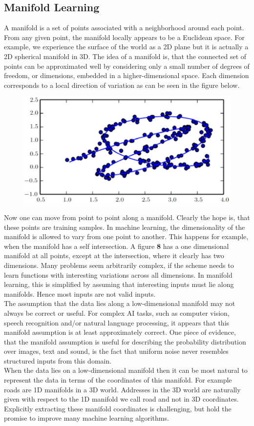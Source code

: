 \begin{multicols}{2}
	\subsection{Manifold Learning}
	A manifold is a set of points associated with a neighborhood around each point.
	From any given point, the manifold locally appears to be a Euclidean space.
	For example, we experience the surface of the world as a 2D plane but it is actually a 2D spherical manifold in 3D.
	The idea of a manifold is, that the connected set of points can be approximated well by considering only a small number of degrees of freedom, or dimensions, embedded in a higher-dimensional space. Each dimension corresponds to a local direction of variation as can be seen in the figure below.
	\begin{figure}[H]
		\centering
		\includegraphics[width=0.75\linewidth]{images/mani.PNG}
	\end{figure}
	Now one can move from point to point along a manifold. Clearly the hope is, that these points are training samples.
	In machine learning, the dimensionality of the manifold is allowed to vary from one point to another.
	This happens for example, when the manifold has a self intersection.
	A figure \textbf{8} has a one dimensional manifold at all points, except at the intersection, where it clearly has two dimensions.
	Many problems seem arbitrarily complex, if the scheme needs to learn functions with interesting variations across all dimensions.
	In manifold learning, this is simplified by assuming that interesting inputs must lie along manifolds. Hence most inputs are not valid inputs.\\

	The assumption that the data lies along a low-dimensional manifold may not always be correct or useful.
	For complex AI tasks, such as computer vision, speech recognition and/or natural language processing, it appears that this manifold assumption is at least approximately correct.
	One piece of evidence, that the manifold assumption is useful for describing the probability distribution over images, text and sound, is the fact that uniform noise never resembles structured inputs from this domain.\\

	When the data lies on a low-dimensional manifold then it can be most natural to represent the data in terms of the coordinates of this manifold.
	For example roads are 1D manifolds in a 3D world. Addresses in the 3D world are naturally given with respect to the 1D manifold we call road and not in 3D coordinates. Explicitly extracting these manifold coordinates is challenging, but hold the promise to improve many machine learning algorithms.
\end{multicols}
\newpage
